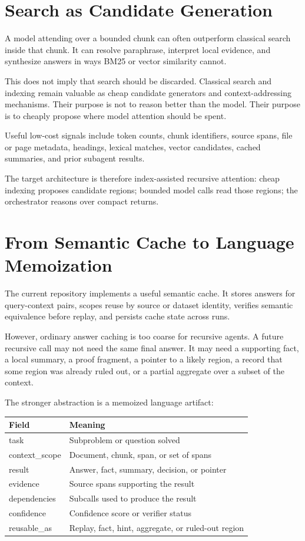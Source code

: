 \documentclass[11pt]{article}
\begin{document}
\section{Search as Candidate Generation}

A model attending over a bounded chunk can often outperform classical search
inside that chunk. It can resolve paraphrase, interpret local evidence, and
synthesize answers in ways BM25 or vector similarity cannot.

This does not imply that search should be discarded. Classical search and
indexing remain valuable as cheap candidate generators and context-addressing
mechanisms. Their purpose is not to reason better than the model. Their purpose
is to cheaply propose where model attention should be spent.

Useful low-cost signals include token counts, chunk identifiers, source spans,
file or page metadata, headings, lexical matches, vector candidates, cached
summaries, and prior subagent results.

The target architecture is therefore index-assisted recursive attention:
cheap indexing proposes candidate regions; bounded model calls read those
regions; the orchestrator reasons over compact returns.

\section{From Semantic Cache to Language Memoization}

The current repository implements a useful semantic cache. It stores answers
for query-context pairs, scopes reuse by source or dataset identity, verifies
semantic equivalence before replay, and persists cache state across runs.

However, ordinary answer caching is too coarse for recursive agents. A future
recursive call may not need the same final answer. It may need a supporting
fact, a local summary, a proof fragment, a pointer to a likely region, a
record that some region was already ruled out, or a partial aggregate over a
subset of the context.

The stronger abstraction is a memoized language artifact:

\begin{center}
\begin{tabular}{ll}
\toprule
\textbf{Field} & \textbf{Meaning} \\
\midrule
task & Subproblem or question solved \\
context\_scope & Document, chunk, span, or set of spans \\
result & Answer, fact, summary, decision, or pointer \\
evidence & Source spans supporting the result \\
dependencies & Subcalls used to produce the result \\
confidence & Confidence score or verifier status \\
reusable\_as & Replay, fact, hint, aggregate, or ruled-out region \\
\bottomrule
\end{tabular}
\end{center}
\end{document}
